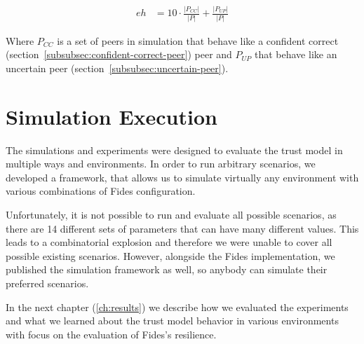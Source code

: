 \begin{equation}
    \begin{split}
    eh &= 10 \cdot \frac{|P_{CC}|}{|P|} + \frac{|P_{UP}|}{|P|}
    \end{split}
    \label{eq:environment_hardness}
\end{equation}

\noindent
Where $P_{CC}$ is a set of peers in simulation that behave like a confident correct (section~\ref{subsubsec:confident-correct-peer}) peer and $P_{UP}$ that behave like an uncertain peer (section~\ref{subsubsec:uncertain-peer}).

\section{Simulation Execution}
\label{sec:simulations-execution}
The simulations and experiments were designed to evaluate the trust model in multiple ways and environments.
In order to run arbitrary scenarios, we developed a framework, that allows us to simulate virtually any environment with various combinations of Fides configuration.

Unfortunately, it is not possible to run and evaluate all possible scenarios, as there are 14 different sets of parameters that can have many different values.
This leads to a combinatorial explosion and therefore we were unable to cover all possible existing scenarios. 
However, alongside the Fides implementation, we published the simulation framework as well, so anybody can simulate their preferred scenarios.

In the next chapter (\ref{ch:results}) we describe how we evaluated the experiments and what we learned about the trust model behavior in various environments with focus on the evaluation of Fides's resilience.